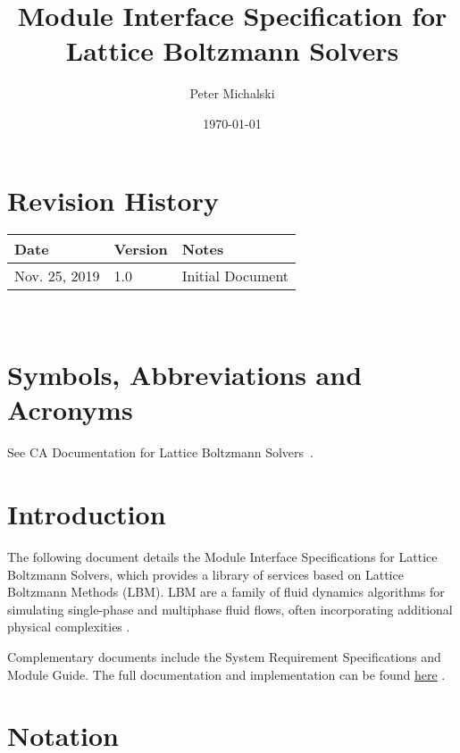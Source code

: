 \documentclass[12pt, titlepage]{article}
\newcommand{\famname}{Lattice Boltzmann Solvers}
\begin{document}
\title{Module Interface Specification for \famname}

\author{Peter Michalski}

\date{\today}

\maketitle


\section{Revision History}

\begin{tabularx}{\textwidth}{p{3cm}p{2cm}X}
\toprule {\bf Date} & {\bf Version} & {\bf Notes}\\
\midrule
Nov. 25, 2019 & 1.0 & Initial Document\\
\bottomrule
\end{tabularx}

~\newpage

\section{Symbols, Abbreviations and Acronyms}

See CA Documentation for \famname \ \citep{LBM_CA_PM}.

\newpage

\tableofcontents

\newpage


\section{Introduction}

The following document details the Module Interface Specifications for
\famname , which provides a library of services based on Lattice Boltzmann Methods (LBM).
LBM are a family of fluid dynamics algorithms for simulating single-phase and multiphase fluid flows, often incorporating additional physical complexities \citep{chen1998lattice}.

Complementary documents include the System Requirement Specifications
and Module Guide.  The full documentation and implementation can be
found \href{https://github.com/peter-michalski/LatticeBoltzmannSolvers}{here} \citep{LBM_PM}.

\section{Notation}
\end{document}
